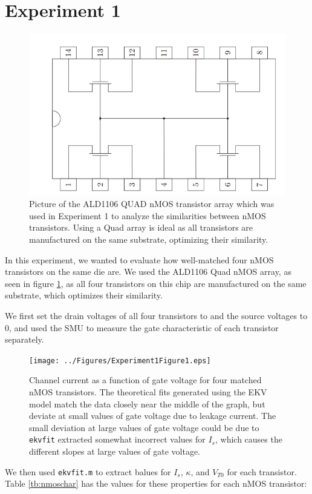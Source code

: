 \section*{Experiment 1}

\begin{figure}[H]
\centering
\includegraphics[width=0.65\linewidth]{../Figures/ald1106}
\caption{Picture of the ALD1106 QUAD nMOS transistor array which was used in Experiment 1 to analyze the similarities between nMOS transistors. Using a Quad array is ideal as all transistors are manufactured on the same substrate, optimizing their similarity.}
\label{fig:ald1106}
\end{figure}


In this experiment, we wanted to evaluate how well-matched four nMOS transistors on the same die are. We used the ALD1106 Quad nMOS array, as seen in figure \ref{fig:ald1106}, as all four transistors on this chip are manufactured on the same substrate, which optimizes their similarity. 

We first set the drain voltages of all four transistors to \Vdd and the source voltages to 0, and used the SMU to measure the gate characteristic of each transistor separately. 

\begin{figure}[H]
\centering
\texttt{[image: ../Figures/Experiment1Figure1.eps]}
\caption{Channel current as a function of gate voltage for four matched nMOS transistors. The theoretical fits generated using the EKV model match the data closely near the middle of the graph, but deviate at small values of gate voltage due to leakage current. The small deviation at large values of gate voltage could be due to \texttt{ekvfit} extracted somewhat incorrect values for $I_s$, which causes the different slopes at large values of gate voltage.}
\label{fig:exp1fig1}
\end{figure}

We then used \texttt{ekvfit.m} to extract balues for $I_s$, $\kappa$, and $V_{T0}$ for each transistor. Table \ref{tb:nmoschar} has the values for these properties for each nMOS transistor:

